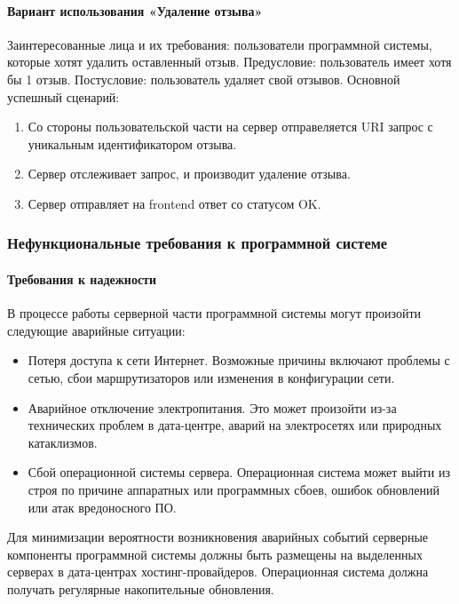 \paragraph{Вариант использования «Удаление отзыва»}
Заинтересованные лица и их требования: пользователи программной системы, которые хотят удалить оставленный отзыв. Предусловие:  пользователь имеет хотя бы 1 отзыв. Постусловие: пользователь удаляет свой отзывов.
Основной успешный сценарий:

\begin{enumerate}
	\item Со стороны пользовательской части на сервер отправеляется URI запрос с уникальным идентификатором отзыва.
	\item Сервер отслеживает запрос, и производит удаление отзыва.
	\item Сервер отправляет на frontend ответ со статусом OK.
\end{enumerate}

\subsubsection{Нефункциональные требования к программной системе}
\paragraph{Требования к надежности}

В процессе работы серверной части программной системы могут произойти следующие аварийные ситуации:

\begin{itemize}
\item Потеря доступа к сети Интернет. Возможные причины включают проблемы с сетью, сбои маршрутизаторов или изменения в конфигурации сети.
\item Аварийное отключение электропитания. Это может произойти из-за технических проблем в дата-центре, аварий на электросетях или природных катаклизмов.
\item Сбой операционной системы сервера. Операционная система может выйти из строя по причине аппаратных или программных сбоев, ошибок обновлений или атак вредоносного ПО.
\end{itemize}

Для минимизации вероятности возникновения аварийных событий серверные компоненты программной системы должны быть размещены на выделенных серверах в дата-центрах хостинг-провайдеров. Операционная система должна получать регулярные накопительные обновления.

